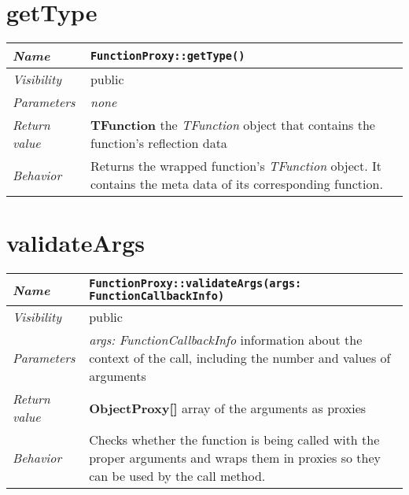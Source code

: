 \section{getType}
\begin{longtable}{p{3cm} @{\hskip 1cm} p{12cm}}
	\hline

	\textit{Name} & \texttt{FunctionProxy::getType()}\\
	\hline

	\textit{Visibility} & public\\
	\hline

	\textit{Parameters} & \textit{none}\\
	\hline

	\textit{Return value} & \textbf{TFunction} the \textit{TFunction} object that contains the function's reflection data\\
	\hline

	\textit{Behavior} & Returns the wrapped function's \textit{TFunction} object. It contains the meta data of its corresponding function.\\
	\hline

\end{longtable}


\section{validateArgs}
\begin{longtable}{p{3cm} @{\hskip 1cm} p{12cm}}
	\hline

	\textit{Name} & \texttt{FunctionProxy::validateArgs(args: FunctionCallbackInfo)}\\
	\hline

	\textit{Visibility} & public\\
	\hline

	\textit{Parameters} & \textit{args: FunctionCallbackInfo} information about the context of the call, including the number and values of arguments\\
	\hline

	\textit{Return value} & \textbf{ObjectProxy[]} array of the arguments as proxies\\
	\hline

	\textit{Behavior} & Checks whether the function is being called with the proper arguments and wraps them in proxies so they can be used by the call method.\\
	\hline

\end{longtable}
\pagebreak


